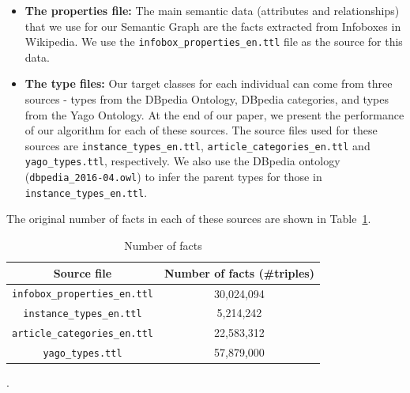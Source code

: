 \documentclass[runningheads,a4paper]{IEEEtran}
\begin{document}
\begin{itemize}
  \item \textbf{The properties file:} The main semantic data  (attributes and relationships) that we use for our Semantic Graph are the facts extracted from Infoboxes in Wikipedia. We use the \texttt{infobox\_properties\_en.ttl} file as the source for this data. 
  \item \textbf{The type files:} Our target classes for each individual can come from three sources - types from the DBpedia Ontology, DBpedia categories, and types from the Yago Ontology. At the end of our paper, we present the performance of our algorithm for each of these sources. The source files used for these sources are \texttt{instance\_types\_en.ttl}, \texttt{article\_categories\_en.ttl} and \texttt{yago\_types.ttl}, respectively. We also use the DBpedia ontology (\texttt{dbpedia\_2016-04.owl}) to infer the parent types for those in \texttt{instance\_types\_en.ttl}.
\end{itemize}
The original number of facts in each of these sources are shown in Table~\ref{tab:sources}.
\begin{table}
\caption{Number of facts}
\begin{center}
  \begin{tabular}{ | c | c | }
    \hline
    \textbf{Source file} & \textbf{Number of facts (\#triples}) \\
    \hline
    \texttt{infobox\_properties\_en.ttl} & 30,024,094 \\
    \hline
    \texttt{instance\_types\_en.ttl} & 5,214,242 \\
    \hline
    \texttt{article\_categories\_en.ttl} & 22,583,312 \\
    \hline
    \texttt{yago\_types.ttl} & 57,879,000 \\
    \hline
  \end{tabular}
\end{center}
\label{tab:sources}.
\end{table}
\end{document}
